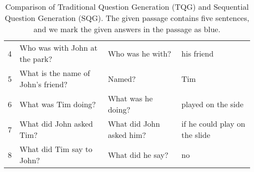 \documentclass[11pt,a4paper]{article}
\begin{document}
\begin{table*}[t!]
\begin{tabular}{clll}
		\multicolumn{1}{c|}{4}                                                                                 & \multicolumn{1}{l|}{Who was with John at the park?}                                                                                         & \multicolumn{1}{l|}{Who was he with?}                                                                                        & his friend                                                                                                   \\
		\multicolumn{1}{c|}{5}                                                                                 & \multicolumn{1}{l|}{What is the name of John's friend?}                                                                                & \multicolumn{1}{l|}{Named?}                                                                                                  & Tim                                                                                                          \\
		\multicolumn{1}{c|}{6}                                                                                 & \multicolumn{1}{l|}{What was Tim doing?}                                                                                               & \multicolumn{1}{l|}{What was he doing?}                                                                                      & played on the side                                                                                           \\
		\multicolumn{1}{c|}{7}                                                                                 & \multicolumn{1}{l|}{What did John asked Tim?}                                                                                     & \multicolumn{1}{l|}{What did John asked him?}                                                                                & if he could play on the slide                                                                                \\
		\multicolumn{1}{c|}{8}                                                                                 & \multicolumn{1}{l|}{What did Tim say to John?}                                                                                               & \multicolumn{1}{l|}{What did he say?}                                                                                        & no                                                                                                           \\ \hline
	\end{tabular}
	\caption{Comparison of Traditional Question Generation (TQG) and Sequential Question Generation (SQG). The given passage contains five sentences, and we mark the given answers in the passage as blue.}
	\label{Tab:Example}
\end{table*}
\end{document}
